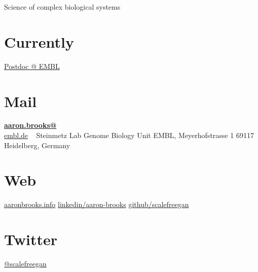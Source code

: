 \documentclass[]{friggeri-cv}
\begin{document}
      {Science of complex biological systems}


\begin{aside}
  \section{Currently}
    \href{http://www.embl.de/research/units/genome_biology/steinmetz/}{Postdoc @ EMBL}
    ~
  \section{Mail}
    \href{mailto:aaron.brooks@embl.de}{\textbf{aaron.brooks@}\\embl.de}
    ~
    Steinmetz Lab
    Genome Biology Unit
    EMBL, Meyerhofstrasse 1
    69117 Heidelberg, Germany
    ~
  \section{Web}
    \href{http://www.aaron-brooks.org}{aaronbrooks.info}
    \href{https://www.linkedin.com/pub/aaron-brooks/17/774/3b3}{linkedin/aaron-brooks}
    \href{https://github.com/scalefreegan}{github/scalefreegan}
   ~
  \section{Twitter}
    \href{https://twitter.com/scalefreegan}{@scalefreegan}
    ~
    ~
    ~
    ~
    ~
    ~
    ~
    ~
    ~
    ~
    ~
    ~
    ~
    ~
    ~
    ~
    ~
\end{aside}
\end{document}

